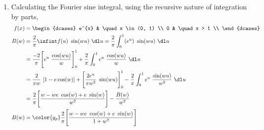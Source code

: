 \begin{enumerate}
    \item Calculating the Fourier sine integral, using the recursive nature of
          integration by parts,
          \begin{align}
              f(x) & = \begin{dcases}
                           e^{x} & \quad x \in (0, 1) \\
                           0     & \quad x > 1        \\
                       \end{dcases}                                 \\
              B(w) & = \frac{2}{\pi} \infint f(u)\ \sin(wu)\ \dl u
              = \frac{2}{\pi} \int_{0}^{1} (e^{u})\ \sin(wu)\ \dl u               \\
                   & = \frac{-2}{\pi} \Bigg[ e^{u}\ \frac{\cos(wu)}{w} \Bigg]_0^1
              + \frac{2}{\pi}\int_{0}^{1} e^{u}\ \frac{\cos(wu)}{w}\ \dl u        \\
                   & = \frac{2}{\pi w}\ [1 - e \cos(w)]
              + \Bigg[ \frac{2e^{u}}{\pi w^2}\ \sin(wu) \Bigg]_0^1
              - \frac{2}{\pi}\int_{0}^{1} e^{u}\ \frac{\sin(wu)}{w^2}\ \dl u      \\
                   & = \frac{2}{\pi}\Bigg[\frac{w - we\ \cos(w)
              + e\ \sin(w)}{w^2}\Bigg] - \frac{B(w)}{w^2}                         \\
              B(w) & = \color{y_p} \frac{2}{\pi}\Bigg[\frac{w - we\ \cos(w)
                      + e\ \sin(w)}{1 + w^2}\Bigg]
          \end{align}


\end{enumerate}
